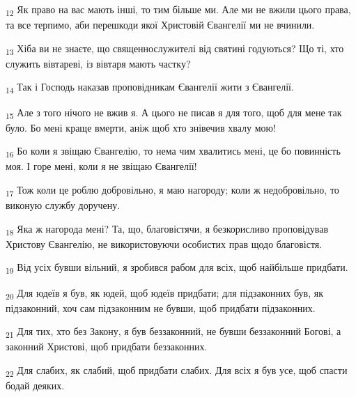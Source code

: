 \begin{tcolorbox}
\textsubscript{12} Як право на вас мають інші, то тим більше ми. Але ми не вжили цього права, та все терпимо, аби перешкоди якої Христовій Євангелії ми не вчинили.
\end{tcolorbox}
\begin{tcolorbox}
\textsubscript{13} Хіба ви не знаєте, що священнослужителі від святині годуються? Що ті, хто служить вівтареві, із вівтаря мають частку?
\end{tcolorbox}
\begin{tcolorbox}
\textsubscript{14} Так і Господь наказав проповідникам Євангелії жити з Євангелії.
\end{tcolorbox}
\begin{tcolorbox}
\textsubscript{15} Але з того нічого не вжив я. А цього не писав я для того, щоб для мене так було. Бо мені краще вмерти, аніж щоб хто знівечив хвалу мою!
\end{tcolorbox}
\begin{tcolorbox}
\textsubscript{16} Бо коли я звіщаю Євангелію, то нема чим хвалитись мені, це бо повинність моя. І горе мені, коли я не звіщаю Євангелії!
\end{tcolorbox}
\begin{tcolorbox}
\textsubscript{17} Тож коли це роблю добровільно, я маю нагороду; коли ж недобровільно, то виконую службу доручену.
\end{tcolorbox}
\begin{tcolorbox}
\textsubscript{18} Яка ж нагорода мені? Та, що, благовістячи, я безкорисливо проповідував Христову Євангелію, не використовуючи особистих прав щодо благовістя.
\end{tcolorbox}
\begin{tcolorbox}
\textsubscript{19} Від усіх бувши вільний, я зробився рабом для всіх, щоб найбільше придбати.
\end{tcolorbox}
\begin{tcolorbox}
\textsubscript{20} Для юдеїв я був, як юдей, щоб юдеїв придбати; для підзаконних був, як підзаконний, хоч сам підзаконним не бувши, щоб придбати підзаконних.
\end{tcolorbox}
\begin{tcolorbox}
\textsubscript{21} Для тих, хто без Закону, я був беззаконний, не бувши беззаконний Богові, а законний Христові, щоб придбати беззаконних.
\end{tcolorbox}
\begin{tcolorbox}
\textsubscript{22} Для слабих, як слабий, щоб придбати слабих. Для всіх я був усе, щоб спасти бодай деяких.
\end{tcolorbox}
